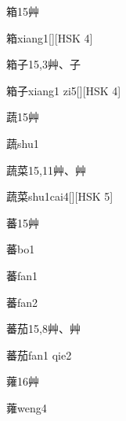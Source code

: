 \begin{Entry}{箱}{15}{⾋}
  \begin{Phonetics}{箱}{xiang1}[][HSK 4]
  \end{Phonetics}
\end{Entry}

\begin{Entry}{箱子}{15,3}{⾋、⼦}
  \begin{Phonetics}{箱子}{xiang1 zi5}[][HSK 4]
  \end{Phonetics}
\end{Entry}

\begin{Entry}{蔬}{15}{⾋}
  \begin{Phonetics}{蔬}{shu1}
  \end{Phonetics}
\end{Entry}

\begin{Entry}{蔬菜}{15,11}{⾋、⾋}
  \begin{Phonetics}{蔬菜}{shu1cai4}[][HSK 5]
  \end{Phonetics}
\end{Entry}

\begin{Entry}{蕃}{15}{⾋}
  \begin{Phonetics}{蕃}{bo1}
  \end{Phonetics}
  \begin{Phonetics}{蕃}{fan1}
  \end{Phonetics}
  \begin{Phonetics}{蕃}{fan2}
  \end{Phonetics}
\end{Entry}

\begin{Entry}{蕃茄}{15,8}{⾋、⾋}
  \begin{Phonetics}{蕃茄}{fan1 qie2}
  \end{Phonetics}
\end{Entry}

\begin{Entry}{蕹}{16}{⾋}
  \begin{Phonetics}{蕹}{weng4}
  \end{Phonetics}
\end{Entry}

